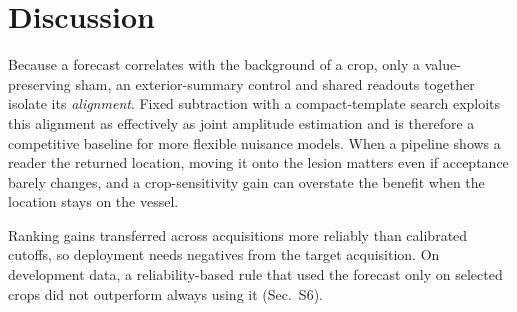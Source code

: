\section{Discussion}
\label{sec:discussion}
Because a forecast correlates with the background of a crop, only a value-preserving sham, an exterior-summary control and shared readouts together isolate its \emph{alignment}. Fixed subtraction with a compact-template search exploits this alignment as effectively as joint amplitude estimation and is therefore a competitive baseline for more flexible nuisance models. When a pipeline shows a reader the returned location, moving it onto the lesion matters even if acceptance barely changes, and a crop-sensitivity gain can overstate the benefit when the location stays on the vessel.

Ranking gains transferred across acquisitions more reliably than calibrated cutoffs, so deployment needs negatives from the target acquisition. On development data, a reliability-based rule that used the forecast only on selected crops did not outperform always using it (Sec.~S6).
